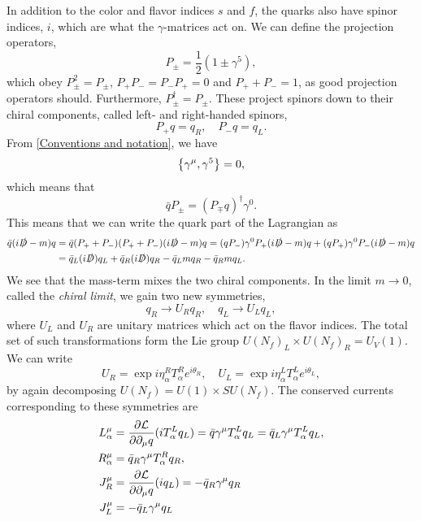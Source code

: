 In addition to the color and flavor indices $s$ and $f$, the quarks also have spinor indices, $i$, which are what the $\gamma$-matrices act on.
We can define the projection operators,
\begin{equation}
    P_\pm = \frac{1}{2}(1 \pm \gamma^5),
\end{equation}
which obey $P_\pm^2 = P_\pm$, $P_+P_- = P_-P_+ = 0$ and $P_+ + P_- = 1$, as good projection operators should.
Furthermore, $P^\dagger_\pm = P_\pm$.
These project spinors down to their chiral components, called left- and right-handed spinors,
\begin{equation}
    P_+ q = q_R, \quad P_- q = q_L.
\end{equation}
From \autoref{Conventions and notation}, we have 
\begin{equation}
    \left\{\gamma^\mu, \gamma^5 \right\} = 0,
\end{equation}
which means that 
\begin{equation}
    \bar q P_\pm = (P_{\mp}q)^\dagger \gamma^0.
\end{equation}
This means that we can write the quark part of the Lagrangian as
\begin{align*}
    \bar q (i\slashed D - m) q
    & = 
    \bar q (P_+ + P_-) (P_+ + P_-) (i\slashed D - m) q
    = (q P_-)\gamma^0 P_+ (i \slashed D - m) q + (q P_+)\gamma^0 P_- (i \slashed D - m) q \\
    & = \bar q_L (i\slashed D) q_L + \bar q_R (i\slashed D) q_R
    - \bar q_L m q_R - \bar q_R m q_L.
\end{align*}
We see that the mass-term mixes the two chiral components.
In the limit $m \rightarrow 0$, called the \emph{chiral limit}, we gain two new symmetries,
\begin{equation}
    q_R \rightarrow U_R q_R, \quad q_L \rightarrow U_L q_L,
\end{equation}
where $U_L$ and $U_R$ are unitary matrices which act on the flavor indices.
The total set of such transformations form the Lie group $U(N_f)_L \times U(N_f)_R=U_V(1)$.
We can write
\begin{equation}
    U_R = \exp{i \eta_\alpha^R T_\alpha^R} e^{i\theta_R}, 
    \quad
    U_L = \exp{i \eta_\alpha^L T_\alpha^L} e^{i\theta_L},
\end{equation}
by again decomposing $U(N_f) = U(1)\times SU(N_f)$.
The conserved currents corresponding to these symmetries are
\begin{align}
    L^{\mu}_\alpha & = 
    \diffp{\Ell}{\partial_\mu q} (iT_\alpha^Lq_L)
    = \bar q \gamma^\mu T_\alpha^L q_L = \bar q_L \gamma^\mu T_\alpha^L q_L, \\
    R^{\mu}_\alpha
    & = \bar q_R \gamma^\mu T_\alpha^R q_R, \\
    J_R^\mu &= \diffp{\Ell}{\partial_\mu q} (iq_L) = - \bar q_R \gamma^\mu q_R \\
    J_L^\mu &= - \bar q_L \gamma^\mu q_L
\end{align}
